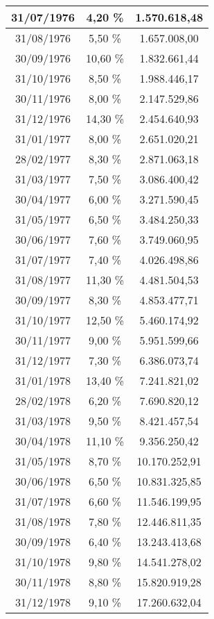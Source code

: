 \begin{center}
\begin{longtable}{|c|c|c|}
31/07/1976 & 4,20 \% & 1.570.618,48  \\ \hline
31/08/1976 & 5,50 \% & 1.657.008,00  \\ \hline
30/09/1976 & 10,60 \% & 1.832.661,44  \\ \hline
31/10/1976 & 8,50 \% & 1.988.446,17  \\ \hline
30/11/1976 & 8,00 \% & 2.147.529,86  \\ \hline
31/12/1976 & 14,30 \% & 2.454.640,93  \\ \hline
31/01/1977 & 8,00 \% & 2.651.020,21  \\ \hline
28/02/1977 & 8,30 \% & 2.871.063,18  \\ \hline
31/03/1977 & 7,50 \% & 3.086.400,42  \\ \hline
30/04/1977 & 6,00 \% & 3.271.590,45  \\ \hline
31/05/1977 & 6,50 \% & 3.484.250,33  \\ \hline
30/06/1977 & 7,60 \% & 3.749.060,95  \\ \hline
31/07/1977 & 7,40 \% & 4.026.498,86  \\ \hline
31/08/1977 & 11,30 \% & 4.481.504,53  \\ \hline
30/09/1977 & 8,30 \% & 4.853.477,71  \\ \hline
31/10/1977 & 12,50 \% & 5.460.174,92  \\ \hline
30/11/1977 & 9,00 \% & 5.951.599,66  \\ \hline
31/12/1977 & 7,30 \% & 6.386.073,74  \\ \hline
31/01/1978 & 13,40 \% & 7.241.821,02  \\ \hline
28/02/1978 & 6,20 \% & 7.690.820,12  \\ \hline
31/03/1978 & 9,50 \% & 8.421.457,54  \\ \hline
30/04/1978 & 11,10 \% & 9.356.250,42  \\ \hline
31/05/1978 & 8,70 \% & 10.170.252,91  \\ \hline
30/06/1978 & 6,50 \% & 10.831.325,85  \\ \hline
31/07/1978 & 6,60 \% & 11.546.199,95  \\ \hline
31/08/1978 & 7,80 \% & 12.446.811,35  \\ \hline
30/09/1978 & 6,40 \% & 13.243.413,68  \\ \hline
31/10/1978 & 9,80 \% & 14.541.278,02  \\ \hline
30/11/1978 & 8,80 \% & 15.820.919,28  \\ \hline
31/12/1978 & 9,10 \% & 17.260.632,04  \\ \hline

\end{longtable}
\end{center}
